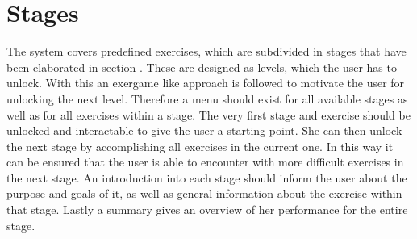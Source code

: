 \section{Stages}\label{4_3_stages}
The system covers predefined exercises, which are subdivided in stages that have been elaborated in section \textit{}. These are designed as levels, which the user has to unlock. With this an exergame like approach is followed to motivate the user for unlocking the next level. Therefore a menu should exist for all available stages as well as for all exercises within a stage. The very first stage and exercise should be unlocked and interactable to give the user a starting point. She can then unlock the next stage by accomplishing all exercises in the current one. In this way it can be ensured that the user is able to encounter with more difficult exercises in the next stage. An introduction into each stage should inform the user about the purpose and goals of it, as well as general information about the exercise within that stage. Lastly a summary gives an overview of her performance for the entire stage.

